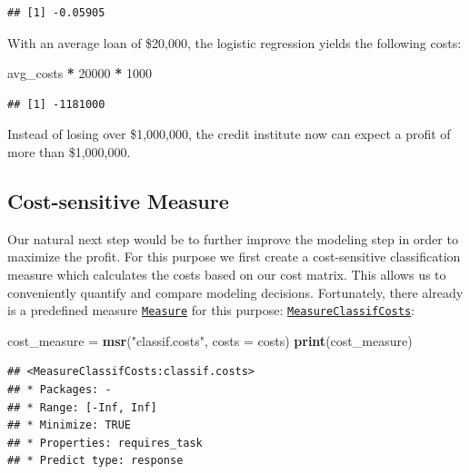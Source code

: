 \documentclass[]{scrbook}
\newenvironment{Shaded}{\begin{snugshade}}{\end{snugshade}}
\newcommand{\DataTypeTok}[1]{\textcolor[rgb]{0.13,0.29,0.53}{#1}}
\newcommand{\DecValTok}[1]{\textcolor[rgb]{0.00,0.00,0.81}{#1}}
\newcommand{\KeywordTok}[1]{\textcolor[rgb]{0.13,0.29,0.53}{\textbf{#1}}}
\newcommand{\NormalTok}[1]{#1}
\newcommand{\OperatorTok}[1]{\textcolor[rgb]{0.81,0.36,0.00}{\textbf{#1}}}
\newcommand{\StringTok}[1]{\textcolor[rgb]{0.31,0.60,0.02}{#1}}
\renewenvironment{Shaded} {\begin{snugshade}\small} {\end{snugshade}}
\begin{document}
\begin{verbatim}
## [1] -0.05905
\end{verbatim}

With an average loan of \$20,000, the logistic regression yields the following costs:

\begin{Shaded}
\begin{Highlighting}[]
\NormalTok{avg_costs }\OperatorTok{*}\StringTok{ }\DecValTok{20000} \OperatorTok{*}\StringTok{ }\DecValTok{1000}
\end{Highlighting}
\end{Shaded}

\begin{verbatim}
## [1] -1181000
\end{verbatim}

Instead of losing over \$1,000,000, the credit institute now can expect a profit of more than \$1,000,000.

\hypertarget{cost-sensitive-measure}{%
\subsection{Cost-sensitive Measure}\label{cost-sensitive-measure}}

Our natural next step would be to further improve the modeling step in order to maximize the profit.
For this purpose we first create a cost-sensitive classification measure which calculates the costs based on our cost matrix.
This allows us to conveniently quantify and compare modeling decisions.
Fortunately, there already is a predefined measure \href{https://mlr3.mlr-org.com/reference/Measure.html}{\texttt{Measure}} for this purpose: \href{https://mlr3.mlr-org.com/reference/mlr_measures_classif.costs.html}{\texttt{MeasureClassifCosts}}:

\begin{Shaded}
\begin{Highlighting}[]
\NormalTok{cost_measure =}\StringTok{ }\KeywordTok{msr}\NormalTok{(}\StringTok{"classif.costs"}\NormalTok{, }\DataTypeTok{costs =}\NormalTok{ costs)}
\KeywordTok{print}\NormalTok{(cost_measure)}
\end{Highlighting}
\end{Shaded}

\begin{verbatim}
## <MeasureClassifCosts:classif.costs>
## * Packages: -
## * Range: [-Inf, Inf]
## * Minimize: TRUE
## * Properties: requires_task
## * Predict type: response
\end{verbatim}
\end{document}
